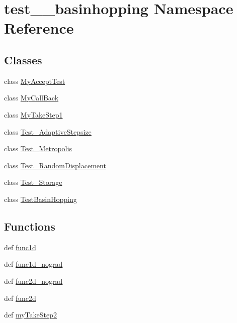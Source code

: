 \hypertarget{namespacetest____basinhopping}{}\section{test\+\_\+\+\_\+basinhopping Namespace Reference}
\label{namespacetest____basinhopping}
\subsection*{Classes}
\begin{DoxyCompactItemize}
\item 
class \hyperlink{classtest____basinhopping_1_1MyAcceptTest}{My\+Accept\+Test}
\item 
class \hyperlink{classtest____basinhopping_1_1MyCallBack}{My\+Call\+Back}
\item 
class \hyperlink{classtest____basinhopping_1_1MyTakeStep1}{My\+Take\+Step1}
\item 
class \hyperlink{classtest____basinhopping_1_1Test__AdaptiveStepsize}{Test\+\_\+\+Adaptive\+Stepsize}
\item 
class \hyperlink{classtest____basinhopping_1_1Test__Metropolis}{Test\+\_\+\+Metropolis}
\item 
class \hyperlink{classtest____basinhopping_1_1Test__RandomDisplacement}{Test\+\_\+\+Random\+Displacement}
\item 
class \hyperlink{classtest____basinhopping_1_1Test__Storage}{Test\+\_\+\+Storage}
\item 
class \hyperlink{classtest____basinhopping_1_1TestBasinHopping}{Test\+Basin\+Hopping}
\end{DoxyCompactItemize}
\subsection*{Functions}
\begin{DoxyCompactItemize}
\item 
def \hyperlink{namespacetest____basinhopping_aa97f72acbc98ddfa02ea52ef708e9907}{func1d}
\item 
def \hyperlink{namespacetest____basinhopping_a750a9ffd6c68b5a849f057b936ea1f8c}{func1d\+\_\+nograd}
\item 
def \hyperlink{namespacetest____basinhopping_aed295a625fa6b45e3ac724fdd6105dce}{func2d\+\_\+nograd}
\item 
def \hyperlink{namespacetest____basinhopping_a08623617a29efef560a570c72c76e9de}{func2d}
\item 
def \hyperlink{namespacetest____basinhopping_aaee5d8b8d160ccfe37f0a265bc1e59f1}{my\+Take\+Step2}
\end{DoxyCompactItemize}


